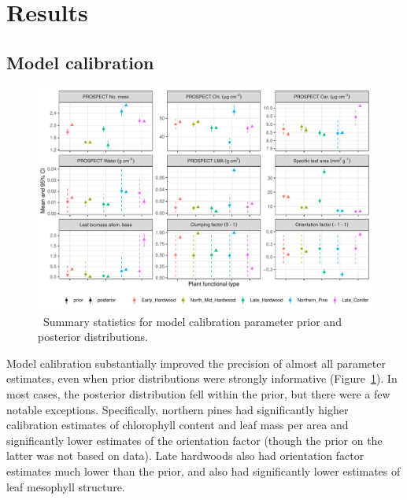 \section{Results}

\subsection{Model calibration}

\begin{figure}
  \centering
  \includegraphics[width=\textwidth]{4_edr/figures/explore_spectra/pda_summary.pdf}
  \caption{\
    Summary statistics for model calibration parameter prior and posterior distributions.
  }\label{fig:pda_posteriors}
\end{figure}

Model calibration substantially improved the precision of almost all parameter estimates, even when prior distributions were strongly informative (Figure~\ref{fig:pda_posteriors}).
In most cases, the posterior distribution fell within the prior, but there were a few notable exceptions.
Specifically, northern pines had significantly higher calibration estimates of chlorophyll content and leaf mass per area and significantly lower estimates of the orientation factor (though the prior on the latter was not based on data).
Late hardwoods also had orientation factor estimates much lower than the prior, and also had significantly lower estimates of leaf mesophyll structure.

